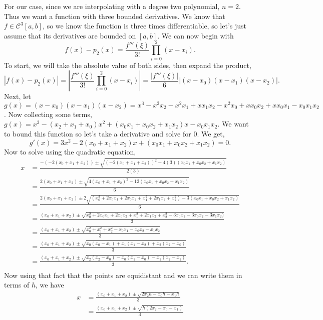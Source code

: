 \documentclass{article}
\begin{document}
\begin{enumerate}[label = {\arabic*}]
\begin{enumerate}
			\hspace{15pt} For our case, since we are interpolating with a degree two polynomial, $n = 2$. Thus we want a function with three bounded derivatives. We know that $f \in \mathcal{C}^3[a, b]$, so we know the function is three times differentiable, so let's just assume that its derivatives are bounded on $[a, b].$ We can now begin with \[f(x) - p_2(x) = \frac{f'''(\xi)}{3!} \prod_{i = 0}^{2} (x - x_i).\] To start, we will take the absolute value of both sides, then expand the product, \[\left| f(x) - p_2(x) \right| = \left| \frac{f'''(\xi)}{3!} \prod_{i = 0}^{2} (x - x_i) \right| =  \frac{\left| f'''(\xi) \right|}{6} \left| (x - x_0)(x - x_1)(x - x_2) \right|.\] Next, let $g(x) = (x - x_0)(x - x_1)(x - x_2) = x^3 - x^2x_2 - x^2x_1 + xx_1x_2 - x^2x_0 + xx_0x_2 + xx_0x_1 - x_0x_1x_2$. Now collecting some terms, $g(x) = x^3 - (x_2 + x_1 + x_0)x^2 + (x_0x_1 + x_0x_2 + x_1x_2)x - x_0x_1x_2.$ We want to bound this function so let's take a derivative and solve for 0. We get, \[g'(x) = 3x^2 - 2(x_0 + x_1 + x_2)x + (x_0x_1 + x_0x_2 + x_1x_2) = 0.\] Now to solve using the quadratic equation,
			\begin{align*}
				x &= \frac{-(-2(x_0 + x_1 + x_2)) \pm \sqrt{(- 2(x_0 + x_1 + x_2))^2 - 4(3)(x_0x_1 + x_0x_2 + x_1x_2)}}{2(3)} \\
				  &= \frac{2(x_0 + x_1 + x_2) \pm \sqrt{4(x_0 + x_1 + x_2)^2 - 12(x_0x_1 + x_0x_2 + x_1x_2)}}{6} \\
				  &= \frac{2(x_0 + x_1 + x_2) \pm 2\sqrt{(x_0^2 + 2x_0x_1 + 2x_0x_2 + x_1^2 + 2x_1x_2 + x_2^2) - 3(x_0x_1 + x_0x_2 + x_1x_2)}}{6} \\
				  &= \frac{(x_0 + x_1 + x_2) \pm \sqrt{x_0^2 + 2x_0x_1 + 2x_0x_2 + x_1^2 + 2x_1x_2 + x_2^2 - 3x_0x_1 - 3x_0x_2 - 3x_1x_2)}}{3} \\
				  &= \frac{(x_0 + x_1 + x_2) \pm \sqrt{x_0^2 + x_1^2 + x_2^2 - x_0x_1 - x_0x_2 - x_1x_2}}{3} \\
				  &= \frac{(x_0 + x_1 + x_2) \pm \sqrt{x_0(x_0 - x_1) + x_1(x_1 - x_2) + x_2(x_2 - x_0)}}{3} \\
				  &= \frac{(x_0 + x_1 + x_2) \pm \sqrt{x_2(x_2 - x_0) - x_0(x_1 - x_0) - x_1(x_2 - x_1)}}{3}. \\
			\end{align*}
			Now using that fact that the points are equidistant and we can write them in terms of $h$, we have
			\begin{align*}
				x &= \frac{(x_0 + x_1 + x_2) \pm \sqrt{2x_2h - x_0h - x_1h}}{3} \\
				  &= \frac{(x_0 + x_1 + x_2) \pm \sqrt{h(2x_2 - x_0 - x_1)}}{3} \\

\end{align*}
\end{enumerate}
\end{enumerate}
\end{document}
